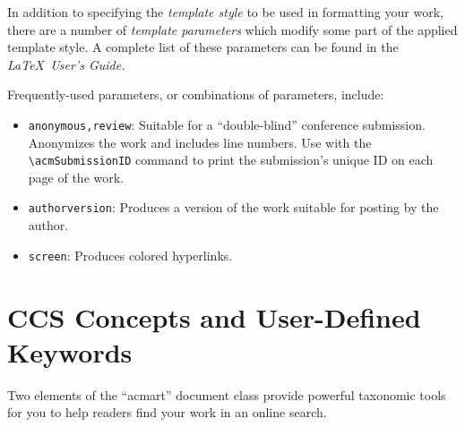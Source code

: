 \documentclass[sigconf]{acmart}
\begin{document}


\maketitle









\iffalse
In addition to specifying the {\itshape template style} to be used in
formatting your work, there are a number of {\itshape template parameters}
which modify some part of the applied template style. A complete list
of these parameters can be found in the {\itshape \LaTeX\ User's Guide.}

Frequently-used parameters, or combinations of parameters, include:
\begin{itemize}
\item {\verb|anonymous,review|}: Suitable for a ``double-blind''
  conference submission. Anonymizes the work and includes line
  numbers. Use with the \verb|\acmSubmissionID| command to print the
  submission's unique ID on each page of the work.
\item{\verb|authorversion|}: Produces a version of the work suitable
  for posting by the author.
\item{\verb|screen|}: Produces colored hyperlinks.
\end{itemize}


\section{CCS Concepts and User-Defined Keywords}

Two elements of the ``acmart'' document class provide powerful
taxonomic tools for you to help readers find your work in an online
search.
\end{document}
